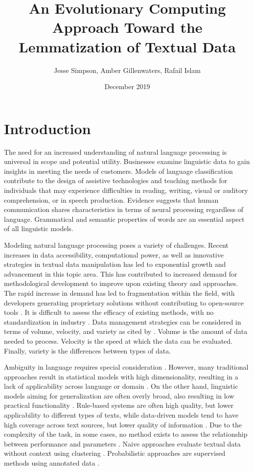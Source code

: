 \documentclass{article}
\title{An Evolutionary Computing Approach Toward the Lemmatization of Textual Data}
\author{Jesse Simpson, Amber Gillenwaters, Rafail Islam}
\date{December 2019}
\begin{document}
\maketitle

\section{Introduction}

The need for an increased understanding of natural language processing is universal in scope and potential utility. Businesses examine linguistic data to gain insights in meeting the needs of customers. Models of language classification contribute to the design of assistive technologies and teaching methods for individuals that may experience difficulties in reading, writing, visual or auditory comprehension, or in speech production. Evidence suggests that human communication shares characteristics in terms of neural processing regardless of language. Grammatical and semantic properties of words are an essential aspect of all linguistic models. 

Modeling natural language processing poses a variety of challenges. Recent increases in data accessibility, computational power, as well as innovative strategies in textual data manipulation has led to exponential growth and advancement in this topic area. This has contributed to increased demand for methodological development to improve upon existing theory and approaches. The rapid increase in demand has led to fragmentation within the field, with developers generating proprietary solutions without contributing to open-source tools \citep{landset2015survey}. It is difficult to assess the efficacy of existing methods, with no standardization in industry \citep{landset2015survey}. Data management strategies can be considered in terms of volume, velocity, and variety \citep{laney20013d} as cited by \citep{landset2015survey}. Volume is the amount of data needed to process. Velocity is the speed at which the data can be evaluated. Finally, variety is the differences between types of data. 

Ambiguity in language requires special consideration \citep{bungum2010evolutionary}. However, many traditional approaches result in statistical models with high dimensionality, resulting in a lack of applicability across language or domain \citep{aghdam2009text}. On the other hand, linguistic models aiming for generalization are often overly broad, also resulting in low practical functionality \citep{nivre2015towards}. Rule-based systems are often high quality, but lower applicability to different types of texts, while data-driven models tend to have high coverage across text sources, but lower quality of information \citep{bungum2010evolutionary}. Due to the complexity of the task, in some cases, no method exists to assess the relationship between performance and parameters \citep{bungum2010evolutionary}. Naive approaches evaluate textual data without context using clustering \citep{bungum2010evolutionary}. Probabilistic approaches are supervised methods using annotated data \citep{bungum2010evolutionary}. 
\end{document}
